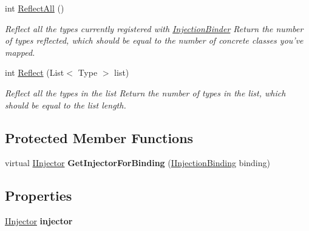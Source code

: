 \begin{DoxyCompactItemize}
\item 
int \hyperlink{classstrange_1_1extensions_1_1injector_1_1impl_1_1_injection_binder_a5a03e345237a56af33953e215852526b}{Reflect\-All} ()
\begin{DoxyCompactList}\small\item\em Reflect all the types currently registered with \hyperlink{classstrange_1_1extensions_1_1injector_1_1impl_1_1_injection_binder}{Injection\-Binder} Return the number of types reflected, which should be equal to the number of concrete classes you've mapped. \end{DoxyCompactList}\item 
\hypertarget{classstrange_1_1extensions_1_1injector_1_1impl_1_1_injection_binder_ac808f26ca7f074695abddb3d517ae49f}{int \hyperlink{classstrange_1_1extensions_1_1injector_1_1impl_1_1_injection_binder_ac808f26ca7f074695abddb3d517ae49f}{Reflect} (List$<$ Type $>$ list)}\label{classstrange_1_1extensions_1_1injector_1_1impl_1_1_injection_binder_ac808f26ca7f074695abddb3d517ae49f}

\begin{DoxyCompactList}\small\item\em Reflect all the types in the list Return the number of types in the list, which should be equal to the list length. \end{DoxyCompactList}\end{DoxyCompactItemize}
\subsection*{Protected Member Functions}
\begin{DoxyCompactItemize}
\item 
\hypertarget{classstrange_1_1extensions_1_1injector_1_1impl_1_1_injection_binder_a4357c848af2d1df4bb2b0d182dcaa553}{virtual \hyperlink{interfacestrange_1_1extensions_1_1injector_1_1api_1_1_i_injector}{I\-Injector} {\bfseries Get\-Injector\-For\-Binding} (\hyperlink{interfacestrange_1_1extensions_1_1injector_1_1api_1_1_i_injection_binding}{I\-Injection\-Binding} binding)}\label{classstrange_1_1extensions_1_1injector_1_1impl_1_1_injection_binder_a4357c848af2d1df4bb2b0d182dcaa553}

\end{DoxyCompactItemize}
\subsection*{Properties}
\begin{DoxyCompactItemize}
\item 
\hypertarget{classstrange_1_1extensions_1_1injector_1_1impl_1_1_injection_binder_a11b411b16f993faf251136793dd294be}{\hyperlink{interfacestrange_1_1extensions_1_1injector_1_1api_1_1_i_injector}{I\-Injector} {\bfseries injector}}\label{classstrange_1_1extensions_1_1injector_1_1impl_1_1_injection_binder_a11b411b16f993faf251136793dd294be}

\end{DoxyCompactItemize}
